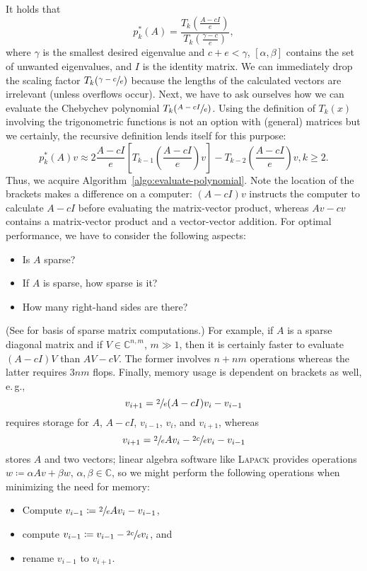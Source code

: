 \documentclass[%
	paper=a4,
	fontsize=10pt,
	DIV11,BCOR10mm,
	numbers=noenddot,
	abstract=yes
]{scrartcl}
\newcommand{\F}{\mathbb{C}}
\theoremstyle{definition}
\newcommand{\propername}[1]{\textsc{#1}}
\begin{document}
It holds that
\[
	p_k^*(A) = \frac%
		{T_k \left(\frac{A-cI}{e}\right)}
		{T_k \left(\frac{\gamma-c}{e}\right)},
\]
where $\gamma$ is the smallest desired eigenvalue and $c+e < \gamma$, $[\alpha,
\beta]$ contains the set of unwanted eigenvalues, and $I$ is the identity
matrix. We can immediately drop the scaling factor $T_k(\sfrac{\gamma-c}{e})$
because the lengths of the calculated vectors are irrelevant (unless overflows
occur). Next, we have to ask ourselves how we can evaluate the Chebychev
polynomial $T_k(\sfrac{A-cI}{e})$. Using the definition of $T_k(x)$ involving
the trigonometric functions is not an option with (general) matrices but we
certainly, the recursive definition lends itself for this purpose:
\[
	p_k^*(A)v \approx
		2 \frac{A - cI}{e} \left[ T_{k-1}\left(\frac{A - cI}{e}\right)v \right]
		- T_{k-2}\left(\frac{A - cI}{e}\right)v, k \geq 2.
\]
Thus, we acquire Algorithm~\ref{algo:evaluate-polynomial}. Note the location of
the brackets makes a difference on a computer: $(A - cI) v$ instructs the
computer to calculate $A - cI$ before evaluating the matrix-vector product,
whereas $Av - cv$ contains a matrix-vector product and a vector-vector addition.
For optimal performance, we have to consider the following aspects:
\begin{itemize}
	\item Is $A$ sparse?
	\item If $A$ is sparse, how sparse is it?
	\item How many right-hand sides are there?
\end{itemize}
(See \cite[§2]{Davis2006} for basis of sparse matrix computations.) For example,
if $A$ is a sparse diagonal matrix and if $V \in \F^{n,m}$, $m \gg 1$, then it
is certainly faster to evaluate $(A - cI) V$ than $AV - cV$. The former involves
$n + nm$ operations whereas the latter requires $3nm$ flops. Finally, memory
usage is dependent on brackets as well, e.\,g.,
\[ v_{i+1} = \sfrac{2}{e} (A - cI) v_i - v_{i-1} \]
requires storage for $A$, $A - cI$, $v_{i-1}$, $v_i$, and $v_{i+1}$, whereas
\[ v_{i+1} = \sfrac{2}{e} A v_i - \sfrac{2c}{e} v_i - v_{i-1} \]
stores $A$ and two vectors; linear algebra software like \propername{Lapack}
provides operations $w \coloneqq \alpha A v + \beta w$, $\alpha, \beta \in \F$,
so we might perform the following operations when minimizing the need for
memory:
\begin{itemize}
	\item Compute $v_{i-1} \coloneqq \sfrac{2}{e} A v_i - v_{i-1}$,
	\item compute $v_{i-1} \coloneqq v_{i-1} - \sfrac{2c}{e} v_i$, and
	\item rename $v_{i-1}$ to $v_{i+1}$.
\end{itemize}
\end{document}
